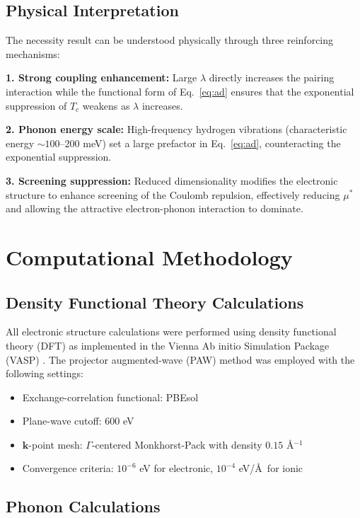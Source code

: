 \documentclass[twocolumn,superscriptaddress]{revtex4-2}
\begin{document}
\subsection{Physical Interpretation}

The necessity result can be understood physically through three reinforcing mechanisms:

\textbf{1. Strong coupling enhancement:} Large $\lambda$ directly increases the pairing interaction while the functional form of Eq.~\eqref{eq:ad} ensures that the exponential suppression of $T_c$ weakens as $\lambda$ increases.

\textbf{2. Phonon energy scale:} High-frequency hydrogen vibrations (characteristic energy $\sim 100$--$200$ meV) set a large prefactor in Eq.~\eqref{eq:ad}, counteracting the exponential suppression.

\textbf{3. Screening suppression:} Reduced dimensionality modifies the electronic structure to enhance screening of the Coulomb repulsion, effectively reducing $\mu^*$ and allowing the attractive electron-phonon interaction to dominate.

\section{Computational Methodology}

\subsection{Density Functional Theory Calculations}

All electronic structure calculations were performed using density functional theory (DFT) as implemented in the Vienna Ab initio Simulation Package (VASP) \cite{kresse1996,kresse1999}. The projector augmented-wave (PAW) method \cite{blochl1994} was employed with the following settings:

\begin{itemize}
\item Exchange-correlation functional: PBEsol \cite{perdew2008}
\item Plane-wave cutoff: 600 eV
\item $\mathbf{k}$-point mesh: $\Gamma$-centered Monkhorst-Pack with density $0.15$ \AA$^{-1}$
\item Convergence criteria: $10^{-6}$ eV for electronic, $10^{-4}$ eV/\AA\ for ionic
\end{itemize}

\subsection{Phonon Calculations}
\end{document}
